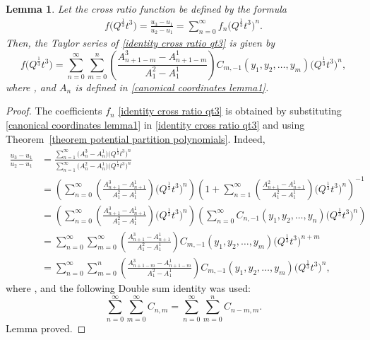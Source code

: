 \documentclass[pdftex]{sigma}
\numberwithin{equation}{section}
\newtheorem{Lemma}[Theorem]{Lemma}
\begin{document}
\begin{Lemma}
Let the cross ratio function be defined by the formula
\begin{gather}
f\bigl(Q^{\frac{1}{3}}t^3\bigr)=\frac{u_3-u_1}{u_2-u_1} =\sum_{n=0}^{\infty} f_n \bigl(Q^{\frac{1}{3}}t^3\bigr)^n.\label{identity cross ratio qt3}
\end{gather}
Then, the Taylor series of \eqref{identity cross ratio qt3} is given by
\[%
f\bigl(Q^{\frac{1}{3}}t^3\bigr)=\sum_{n=0}^{\infty} \sum_{m=0}^{n}\left(\frac{A_{n+1-m}^3-A_{n+1-m}^1}{A_1^2-A_1^1}\right)C_{m,-1}(y_1,y_2,\dots,y_m) \bigl( Q^{\frac{1}{3}}t^3 \bigr)^{n},
\]
where
,
and $A_n$ is defined in \eqref{canonical coordinates lemma1}.
\end{Lemma}

\begin{proof}
The coefficients $f_n$ \eqref{identity cross ratio qt3} is obtained by substituting \eqref{canonical coordinates lemma1} in \eqref{identity cross ratio qt3} and using Theorem~\ref{theorem potential partition polynomials}. Indeed,
\begin{align*}%
\frac{u_3-u_1}{u_2-u_1}&= \frac{\sum_{n=1}^{\infty} \bigl(A_n^3-A_n^1\bigr) \bigl( Q^{\frac{1}{3}}t^3 \bigr)^n}{\sum_{n=1}^{\infty} \bigl(A_n^2-A_n^1\bigr) \bigl( Q^{\frac{1}{3}}t^3 \bigr)^n}\\
&=\left(\sum_{n=0}^{\infty} \left(\frac{A_{n+1}^3-A_{n+1}^1}{A_1^2-A_1^1}\right) \bigl( Q^{\frac{1}{3}}t^3 \bigr)^n\right)\left(1+\sum_{n=1}^{\infty} \left(\frac{A_{n+1}^2-A_{n+1}^1}{A_1^2-A_1^1}\right) \bigl( Q^{\frac{1}{3}}t^3 \bigr)^n\right)^{-1}\\
&=\left(\sum_{n=0}^{\infty} \left(\frac{A_{n+1}^3-A_{n+1}^1}{A_1^2-A_1^1}\right) \bigl( Q^{\frac{1}{3}}t^3 \bigr)^n\right)\left(\sum_{n=0}^{\infty} C_{n,-1}(y_1,y_2,\dots,y_n) \bigl( Q^{\frac{1}{3}}t^3 \bigr)^n\right)\\
&=\sum_{n=0}^{\infty} \sum_{m=0}^{\infty}\left(\frac{A_{n+1}^3-A_{n+1}^1}{A_1^2-A_1^1}\right)C_{m,-1}(y_1,y_2,\dots,y_m) \bigl( Q^{\frac{1}{3}}t^3 \bigr)^{n+m}\\
&=\sum_{n=0}^{\infty} \sum_{m=0}^{n}\left(\frac{A_{n+1-m}^3-A_{n+1-m}^1}{A_1^2-A_1^1}\right)C_{m,-1}(y_1,y_2,\dots,y_m) \bigl( Q^{\frac{1}{3}}t^3 \bigr)^{n},
\end{align*}
where
,
and the following Double sum identity was used:
\[
\sum_{n=0}^{\infty}\sum_{m=0}^{\infty} C_{n,m}=\sum_{n=0}^{\infty}\sum_{m=0}^{n} C_{n-m,m}.
\]
Lemma proved.
\end{proof}
\end{document}
